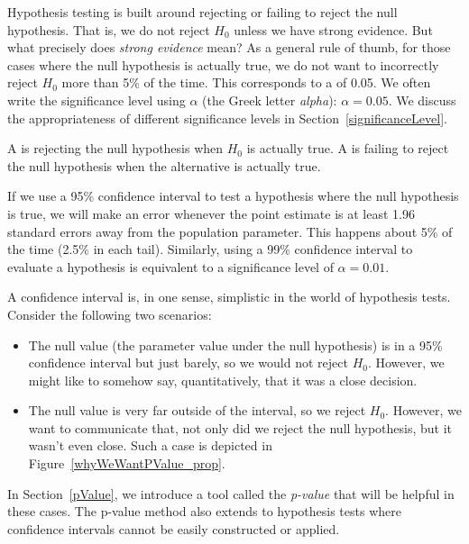 Hypothesis testing is built around rejecting or failing to reject the null hypothesis. That is, we do not reject $H_0$ unless we have strong evidence. But what precisely does \emph{strong evidence} mean? As a general rule of thumb, for those cases where the null hypothesis is actually true, we do not want to incorrectly reject $H_0$ more than 5\% of the time. This corresponds to a  of 0.05. We often write the significance level using $\alpha$ (the Greek letter \emph{alpha}): $\alpha = 0.05$. We discuss the appropriateness of different significance levels in Section~\ref{significanceLevel}.

A  is rejecting the null hypothesis when $H_0$ is actually true. A  is failing to reject the null hypothesis when the alternative is actually true.

If we use a 95\% confidence interval to test a hypothesis where the null hypothesis is true, we will make an error whenever the point estimate is at least 1.96 standard errors away from the population parameter. This happens about 5\% of the time (2.5\% in each tail). Similarly, using a 99\% confidence interval to evaluate a hypothesis is equivalent to a significance level of $\alpha = 0.01$.

A confidence interval is, in one sense, simplistic in the world of hypothesis tests. Consider the following two scenarios:
\begin{itemize}
\setlength{\itemsep}{0mm}
\item The null value (the parameter value under the null hypothesis) is in a 95\% confidence interval but just barely, so we would not reject $H_0$. However, we might like to somehow say, quantitatively, that it was a close decision.
\item The null value is very far outside of the interval, so we reject $H_0$. However, we want to communicate that, not only did we reject the null hypothesis, but it wasn't even close. Such a case is depicted in Figure~\ref{whyWeWantPValue_prop}.
\end{itemize}
In Section~\ref{pValue}, we introduce a tool called the \emph{p-value} that will be helpful in these cases. The p-value method also extends to hypothesis tests where confidence intervals cannot be easily constructed or applied.

